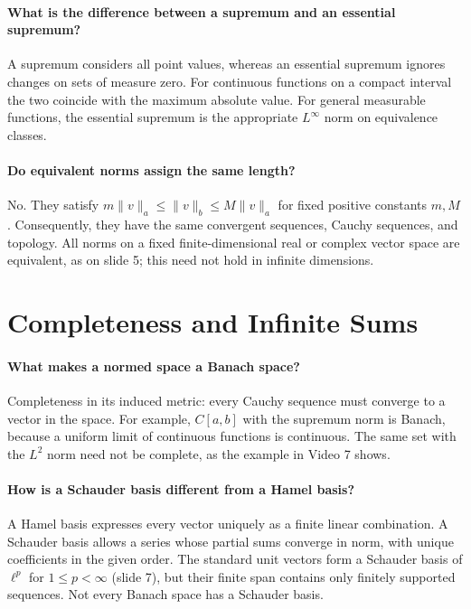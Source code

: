 \documentclass[10pt,english]{article}
\begin{document}
\paragraph{What is the difference between a supremum and an essential supremum?}
A supremum considers all point values, whereas an essential supremum ignores changes on sets of measure zero.
For continuous functions on a compact interval the two coincide with the maximum absolute value.
For general measurable functions, the essential supremum is the appropriate $L^\infty$ norm on equivalence classes.

\paragraph{Do equivalent norms assign the same length?}
No. They satisfy $m\|v\|_a\leq\|v\|_b\leq M\|v\|_a$ for fixed positive constants $m,M$.
Consequently, they have the same convergent sequences, Cauchy sequences, and topology.
All norms on a fixed finite-dimensional real or complex vector space are equivalent, as on slide 5; this need not hold in infinite dimensions.

\section{Completeness and Infinite Sums}

\paragraph{What makes a normed space a Banach space?}
Completeness in its induced metric: every Cauchy sequence must converge to a vector in the space.
For example, $C[a,b]$ with the supremum norm is Banach, because a uniform limit of continuous functions is continuous.
The same set with the $L^2$ norm need not be complete, as the example in Video 7 shows.

\paragraph{How is a Schauder basis different from a Hamel basis?}
A Hamel basis expresses every vector uniquely as a finite linear combination.
A Schauder basis allows a series whose partial sums converge in norm, with unique coefficients in the given order.
The standard unit vectors form a Schauder basis of $\ell^p$ for $1\leq p<\infty$ (slide 7), but their finite span contains only finitely supported sequences.
Not every Banach space has a Schauder basis.
\end{document}
